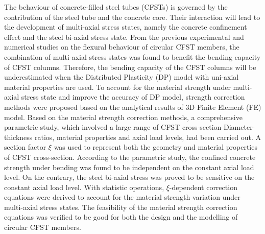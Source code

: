 \abstract
The behaviour of concrete-filled steel tubes (CFSTs) is governed by the contribution of the steel tube and the concrete core. Their interaction will lead to the development of multi-axial stress states, namely the concrete confinement effect and the steel bi-axial stress state. From the previous experimental and numerical studies on the flexural behaviour of circular CFST members, the combination of multi-axial stress states was found to benefit the bending capacity of CFST columns. Therefore, the bending capacity of the CFST columns will be underestimated when the Distributed Plasticity (DP) model with uni-axial material properties are used. To account for the material strength under multi-axial stress state and improve the accuracy of DP model, strength correction methods were proposed based on the analytical results of 3D Finite Element (FE) model. Based on the material strength correction methods, a comprehensive parametric study, which involved a large range of CFST cross-section Diameter-thickness ratios, material properties and axial load levels, had been carried out. A section factor $\xi$ was used to represent both the geometry and material properties of CFST cross-section. According to the parametric study, the confined concrete strength under bending was found to be independent on the constant axial load level. On the contrary, the steel bi-axial stress was proved to be sensitive on the constant axial load level. With statistic operations, $\xi$-dependent correction equations were derived to account for the material strength variation under multi-axial stress states. The feasibility of the material strength correction equations was verified to be good for both the design and the modelling of circular CFST members.
